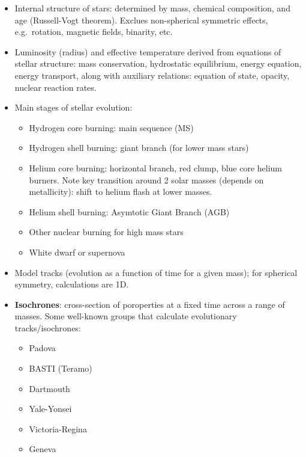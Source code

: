 \documentclass{article}
\begin{document}
\begin{itemize}
    \item Internal structure of stars: determined by mass, chemical
        composition, and age (Russell-Vogt theorem). Exclues
        non-spherical symmetric effects, e.g.\ rotation, magnetic
        fields, binarity, etc.
    \item Luminosity (radius) and effective temperature derived from
        equations of stellar structure: mass conservation, hydrostatic
        equilibrium, energy equation, energy transport, along
        with auxiliary relations: equation of state, opacity, nuclear
        reaction rates.
    \item Main stages of stellar evolution:
        \begin{itemize} %
            \item Hydrogen core burning: main sequence (MS)
            \item Hydrogen shell burning: giant branch (for lower mass
                stars)
            \item Helium core burning: horizontal branch, red clump,
                blue core helium burners. Note key transition around 2
                solar masses (depends on metallicity): shift to helium
                flash at lower masses.
            \item Helium shell burning: Asymtotic Giant Branch (AGB)
            \item Other nuclear burning for high mass stars
            \item White dwarf or supernova
        \end{itemize} %
    \item Model tracks (evolution as a function of time for a given
      mass); for spherical symmetry, calculations are 1D.
    \item \textbf{Isochrones}: cross-section of poroperties at a
      fixed time across a range of masses. Some well-known groups that
      calculate evolutionary tracks/isochrones:
      \begin{itemize}
          \item Padova
          \item BASTI (Teramo)
          \item Dartmouth
          \item Yale-Yonsei
          \item Victoria-Regina
          \item Geneva
      \end{itemize}

\end{itemize}
\end{document}
